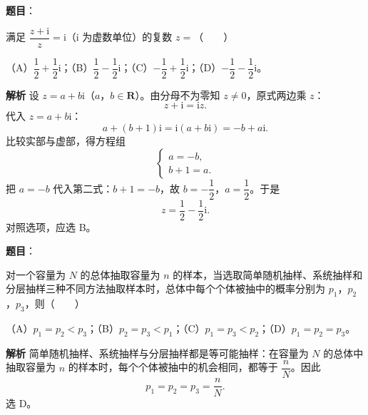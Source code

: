 

\begin{answer}

\textbf{题目}：

满足 $\dfrac{z+\mathrm i}{z}=\mathrm i$（$\mathrm i$ 为虚数单位）的复数 $z=$\mbox{（　　）}

（A）$\dfrac12+\dfrac12\mathrm i$；（B）$\dfrac12-\dfrac12\mathrm i$；（C）$-\dfrac12+\dfrac12\mathrm i$；（D）$-\dfrac12-\dfrac12\mathrm i$。

\textbf{解析}
设 $z=a+b\mathrm i$（$a$，$b\in\mathbf R$）。由分母不为零知 $z\neq0$，原式两边乘 $z$：
\nopagebreak[4]
\[z+\mathrm i=\mathrm i z .\]
代入 $z=a+b\mathrm i$：
\nopagebreak[4]
\[a+(b+1)\mathrm i=\mathrm i(a+b\mathrm i)=-b+a\mathrm i .\]
比较实部与虚部，得方程组
\nopagebreak[4]
\[\begin{cases}
a=-b,\\
b+1=a .
\end{cases}\]
把 $a=-b$ 代入第二式：$b+1=-b$，故 $b=-\dfrac12$，$a=\dfrac12$。于是
\nopagebreak[4]
\[z=\frac12-\frac12\mathrm i .\]
对照选项，应选 B。


\end{answer}
\begin{answer}

\textbf{题目}：

对一个容量为 $N$ 的总体抽取容量为 $n$ 的样本，当选取简单随机抽样、系统抽样和分层抽样三种不同方法抽取样本时，总体中每个个体被抽中的概率分别为 $p_1$，$p_2$，$p_3$，则\mbox{（　　）}

（A）$p_1=p_2<p_3$；（B）$p_2=p_3<p_1$；（C）$p_1=p_3<p_2$；（D）$p_1=p_2=p_3$。

\textbf{解析}
简单随机抽样、系统抽样与分层抽样都是等可能抽样：在容量为 $N$ 的总体中抽取容量为 $n$ 的样本时，每个个体被抽中的机会相同，都等于 $\dfrac nN$。因此
\nopagebreak[4]
\[p_1=p_2=p_3=\frac nN .\]
选 D。


\end{answer}
